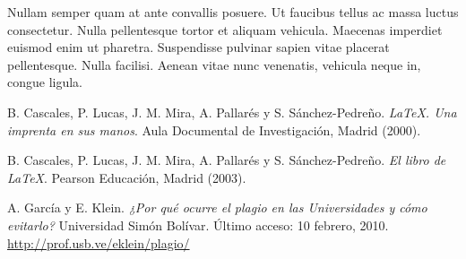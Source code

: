 \documentclass[DIV=calc,paper=a4,fontsize=11pt,twocolumn]{scrartcl} %
\begin{document}
Nullam semper quam at ante convallis posuere. Ut faucibus tellus ac massa luctus consectetur. Nulla pellentesque tortor et aliquam vehicula. Maecenas imperdiet euismod enim ut pharetra. Suspendisse pulvinar sapien vitae placerat pellentesque. Nulla facilisi. Aenean vitae nunc venenatis, vehicula neque in, congue ligula.

\renewcommand{\refname}{Bibliografía} %

\begin{thebibliography}{99}

 B. Cascales, P. Lucas, J. M. Mira, A. Pallarés y S. Sánchez-Pedreño. \emph{\LaTeX. Una imprenta en sus manos}. Aula Documental de Investigación, Madrid (2000).

 B. Cascales, P. Lucas, J. M. Mira, A. Pallarés y S. Sánchez-Pedreño. \emph{El libro de \LaTeX}. Pearson Educación, Madrid (2003).

 A. García y E. Klein. \emph{¿Por qué ocurre el plagio en las Universidades y cómo evitarlo?} Universidad Simón Bolívar. Último acceso: 10 febrero, 2010.\\
\url{http://prof.usb.ve/eklein/plagio/}
 
\end{thebibliography}
\end{document}

